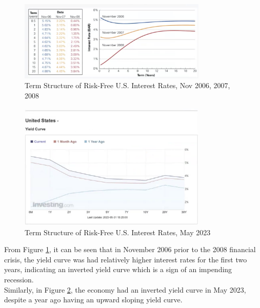 \begin{figure}[H]
    \centering
    \includegraphics[width=0.8\textwidth]{img/2.3.png}
    \caption{Term Structure of Risk-Free U.S. Interest Rates, Nov 2006, 2007, 2008}
    \label{fig:term_structure}
\end{figure}
\begin{figure}[H]
    \centering
    \includegraphics[width=0.8\textwidth]{img/2.4.png}
    \caption{Term Structure of Risk-Free U.S. Interest Rates, May 2023}
    \label{fig:term_structure2}
\end{figure}

From Figure \ref{fig:term_structure}, it can be seen that in November 2006 prior to the 2008 financial crisis, the yield curve was had relatively higher interest rates for the first two years, indicating an inverted yield curve which is a sign of an impending recession.\\

Similarly, in Figure \ref{fig:term_structure2}, the economy had an inverted yield curve in May 2023, despite a year ago having an upward sloping yield curve. 


